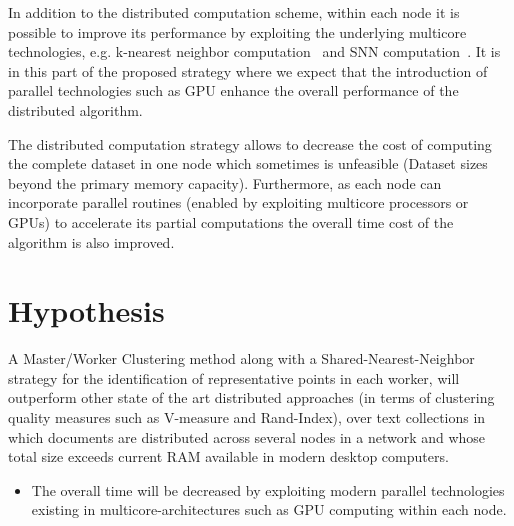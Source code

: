 \documentclass[10pt]{article}
\begin{document}
In addition to the distributed computation scheme, within each node it is possible to improve its performance by exploiting the underlying multicore technologies, e.g. k-nearest neighbor computation~\citep{GMNAG15} and SNN computation~\citep{KMGBG16}. 
It is in this part of the proposed strategy where we expect that the introduction of parallel technologies such as GPU enhance the overall performance of the distributed algorithm.

The distributed computation strategy allows to decrease the cost of computing the complete dataset in one node which sometimes is unfeasible (Dataset sizes beyond the primary memory capacity). Furthermore, as each node can incorporate parallel routines (enabled by exploiting multicore processors or GPUs) to accelerate its partial computations the overall time cost of the algorithm is also improved.

\section{Hypothesis}


A Master/Worker Clustering method along with a Shared-Nearest-Neighbor strategy for the identification of representative points in each worker, will outperform other state of the art distributed approaches (in terms of clustering quality measures such as V-measure and Rand-Index), over text collections in which documents are distributed across several nodes in a network and whose total size exceeds current RAM available in modern desktop computers.
\begin{itemize}
\item The overall time will be decreased by exploiting modern parallel technologies existing in multicore-architectures such as GPU computing within each node.
\end{itemize}
\end{document}
